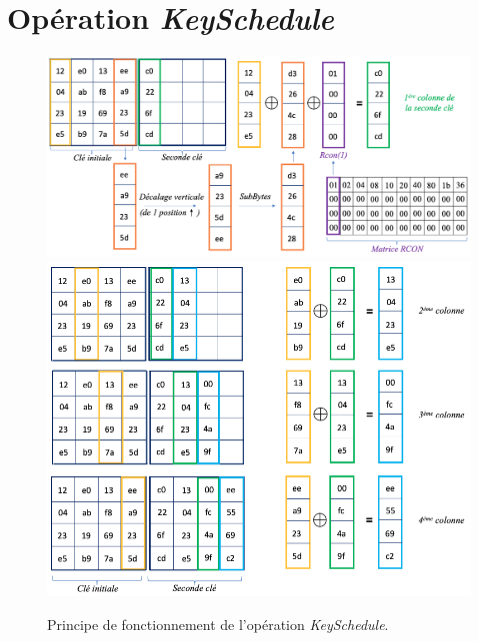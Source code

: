 \documentclass[10pt, oneside, a4paper]{article}
\begin{document}
\section{Opération \textit{KeySchedule}}
\label{ann:KeySchedule}
\begin{figure}[htbp]
    \centering
    \includegraphics[scale=0.35]{image/KeySchedule1}
    \includegraphics[scale=0.48]{image/KeySchedule2}
    \caption{Principe de fonctionnement de l'opération \textit{KeySchedule}.}
    \label{fig:KeySchedule1}
\end{figure}

\newpage

\end{document}
